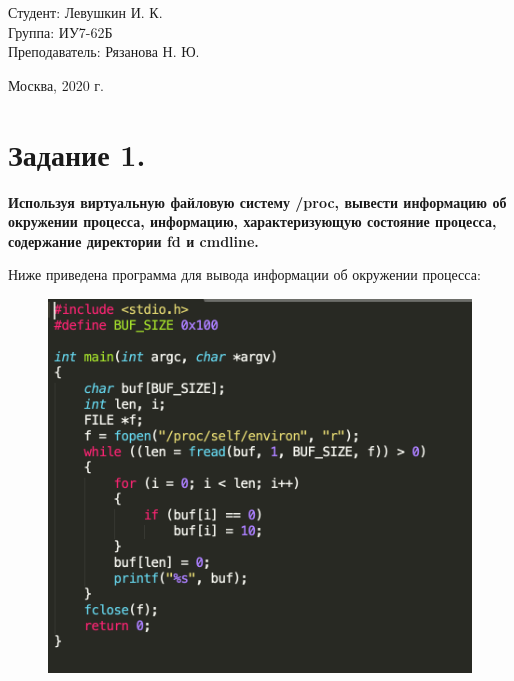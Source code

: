 \documentclass[a4paper,12pt]{article}
\begin{document}
	\large
	\begin{flushright}
		Студент: Левушкин И. К. \\
		Группа: ИУ7-62Б \\
		Преподаватель: Рязанова Н. Ю. \\
	\end{flushright}
	
	\vspace*{30mm}
	\begin{center}
		Москва, 2020 г.  
	\end{center}
	\thispagestyle{empty}
	
	
	\newpage
	
	\section*{Задание 1.}
	{\bf Используя виртуальную файловую систему /proc, вывести информацию об окружении процесса, информацию, характеризующую состояние процесса, содержание директории fd и cmdline.}
		
	Ниже приведена программа для вывода информации об окружении процесса:
	
	\begin{figure}[h!]
		\begin{center}
			{\includegraphics[scale = 1.0]{round.png}}
			\label{ris:round}
		\end{center}
	\end{figure}
\end{document}
